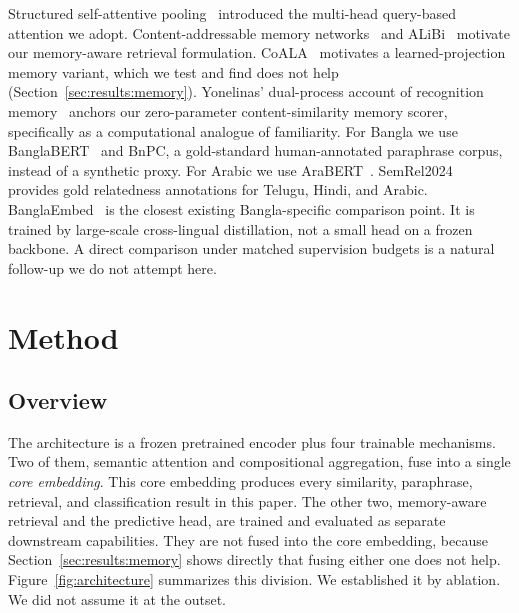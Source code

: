\documentclass[manuscript]{acmart}
\begin{document}
Structured self-attentive pooling~\citep{lin2017structured} introduced the multi-head query-based attention we adopt. Content-addressable memory networks~\citep{sukhbaatar2015memnn} and ALiBi~\citep{press2021alibi} motivate our memory-aware retrieval formulation. CoALA~\citep{sumers2023coala} motivates a learned-projection memory variant, which we test and find does not help (Section~\ref{sec:results:memory}). Yonelinas' dual-process account of recognition memory~\citep{yonelinas2002dual} anchors our zero-parameter content-similarity memory scorer, specifically as a computational analogue of familiarity. For Bangla we use BanglaBERT~\citep{bhattacharjee2022banglabert} and BnPC, a gold-standard human-annotated paraphrase corpus, instead of a synthetic proxy. For Arabic we use AraBERT~\citep{antoun2020arabert}. SemRel2024~\citep{ousidhoum2024semrel} provides gold relatedness annotations for Telugu, Hindi, and Arabic. BanglaEmbed~\citep{kabir2024banglaembed} is the closest existing Bangla-specific comparison point. It is trained by large-scale cross-lingual distillation, not a small head on a frozen backbone. A direct comparison under matched supervision budgets is a natural follow-up we do not attempt here.

\section{Method}
\label{sec:method}

\subsection{Overview}

The architecture is a frozen pretrained encoder plus four trainable mechanisms. Two of them, semantic attention and compositional aggregation, fuse into a single \emph{core embedding}. This core embedding produces every similarity, paraphrase, retrieval, and classification result in this paper. The other two, memory-aware retrieval and the predictive head, are trained and evaluated as separate downstream capabilities. They are not fused into the core embedding, because Section~\ref{sec:results:memory} shows directly that fusing either one does not help. Figure~\ref{fig:architecture} summarizes this division. We established it by ablation. We did not assume it at the outset.
\end{document}
